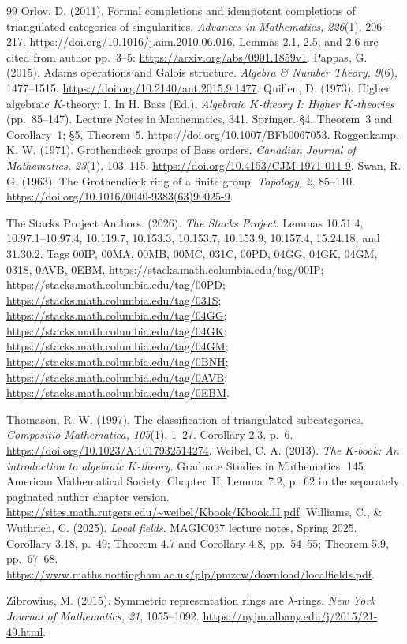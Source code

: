 \documentclass[11pt,a4paper]{article}
\theoremstyle{definition}\newtheorem{definition}[theorem]{Definition}
\theoremstyle{remark}\newtheorem{remark}[theorem]{Remark}
\begin{document}
\begin{thebibliography}{99}
Orlov, D. (2011). Formal completions and idempotent completions of triangulated
categories of singularities. \emph{Advances in Mathematics, 226}(1), 206--217.
\url{https://doi.org/10.1016/j.aim.2010.06.016}.
Lemmas 2.1, 2.5, and 2.6 are cited from author pp.~3--5:
\url{https://arxiv.org/abs/0901.1859v1}.
Pappas, G. (2015). Adams operations and Galois structure.
\emph{Algebra \& Number Theory, 9}(6), 1477--1515.
\url{https://doi.org/10.2140/ant.2015.9.1477}.
Quillen, D. (1973). Higher algebraic $K$-theory: I.
In H. Bass (Ed.), \emph{Algebraic $K$-theory I: Higher
$K$-theories} (pp.~85--147). Lecture Notes in Mathematics, 341.
Springer. \S4, Theorem~3 and Corollary~1; \S5, Theorem~5.
\url{https://doi.org/10.1007/BFb0067053}.
Roggenkamp, K. W. (1971). Grothendieck groups of Bass orders.
\emph{Canadian Journal of Mathematics, 23}(1), 103--115.
\url{https://doi.org/10.4153/CJM-1971-011-9}.
Swan, R. G. (1963). The Grothendieck ring of a finite group.
\emph{Topology, 2}, 85--110.
\url{https://doi.org/10.1016/0040-9383(63)90025-9}.
{\raggedright
The Stacks Project Authors. (2026). \emph{The Stacks Project}.
Lemmas 10.51.4, 10.97.1--10.97.4, 10.119.7, 10.153.3,
10.153.7, 10.153.9, 10.157.4, 15.24.18, and 31.30.2.
Tags 00IP, 00MA, 00MB, 00MC, 031C, 00PD, 04GG, 04GK, 04GM, 031S, 0AVB, 0EBM.
\url{https://stacks.math.columbia.edu/tag/00IP};
\url{https://stacks.math.columbia.edu/tag/00PD};
\url{https://stacks.math.columbia.edu/tag/031S};
\url{https://stacks.math.columbia.edu/tag/04GG};
\url{https://stacks.math.columbia.edu/tag/04GK};
\url{https://stacks.math.columbia.edu/tag/04GM};
\url{https://stacks.math.columbia.edu/tag/0BNH};
\url{https://stacks.math.columbia.edu/tag/0AVB};
\url{https://stacks.math.columbia.edu/tag/0EBM}.\par}

Thomason, R. W. (1997). The classification of triangulated subcategories.
\emph{Compositio Mathematica, 105}(1), 1--27. Corollary 2.3, p.~6.
\url{https://doi.org/10.1023/A:1017932514274}.
Weibel, C. A. (2013). \emph{The K-book: An introduction to
algebraic $K$-theory}. Graduate Studies in Mathematics, 145.
American Mathematical Society. Chapter~II, Lemma~7.2,
p.~62 in the separately paginated author chapter version.
\url{https://sites.math.rutgers.edu/~weibel/Kbook/Kbook.II.pdf}.
Williams, C., \& Wuthrich, C. (2025). \emph{Local fields}.
MAGIC037 lecture notes, Spring 2025. Corollary 3.18, p.~49;
Theorem 4.7 and Corollary 4.8, pp.~54--55; Theorem 5.9, pp.~67--68.
\url{https://www.maths.nottingham.ac.uk/plp/pmzcw/download/localfields.pdf}.

Zibrowius, M. (2015). Symmetric representation rings are
$\lambda$-rings. \emph{New York Journal of Mathematics, 21},
1055--1092. \url{https://nyjm.albany.edu/j/2015/21-49.html}.
\end{thebibliography}
\endgroup
\end{document}
